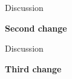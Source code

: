 \documentclass[lesson_slides]{subfiles}
\begin{document}
\begin{frame}[c]{Discussion}
    
\begin{center}
    \textbf{Second change}
\end{center}
  
\end{frame}
\begin{frame}[c]{Discussion}
    
\begin{center}
    \textbf{Third change}
\end{center}
  
\end{frame}
\end{document}
